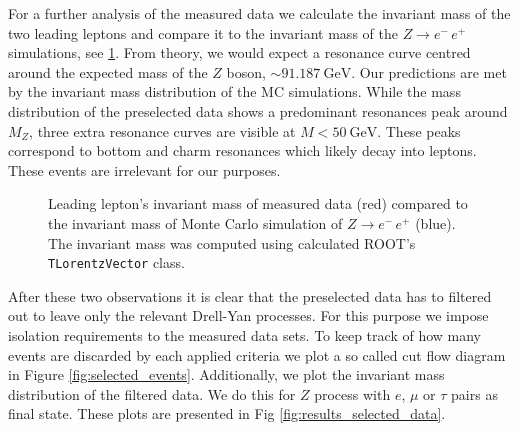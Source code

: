 \documentclass[11 pt]{article}
\begin{document}
For a further analysis of the measured data we calculate the invariant mass of the two leading leptons and compare it to the invariant mass of the $Z\to e^-\,e^+$ simulations, see \ref{fig:inv_mas}. From theory, we would expect a resonance curve centred around the expected mass of the $Z$ boson, $\sim \SI{91,187}{\giga\electronvolt}$. Our predictions are met by the invariant mass distribution of the MC simulations. While the mass distribution of the preselected data shows a predominant resonances peak around $M_Z$, three extra resonance curves are visible at $M< \SI{50}{\giga\electronvolt}$. These peaks correspond to bottom and charm resonances which likely decay into leptons. These events are irrelevant for our purposes. 
\begin{figure}[htbp]
    \centering
    \begin{subfigure}{0.5\textwidth}
        \centering
    \end{subfigure}
        \caption{\small Leading lepton's invariant mass of measured data (red) compared to the invariant mass of Monte Carlo simulation of $Z\to e^-\,e^+$ (blue). The invariant mass was computed using calculated ROOT's \texttt{TLorentzVector} class.}
        \label{fig:inv_mas}
\end{figure}

After these two observations it is clear that the preselected data has to filtered out to leave only the relevant Drell-Yan processes. For this purpose we impose isolation requirements to the measured data sets. To keep track of how many events are discarded by each applied criteria we plot a so called cut flow diagram in Figure \ref{fig:selected_events}. Additionally, we plot the invariant mass distribution of the filtered data. We do this for $Z$ process with $e$, $\mu$ or $\tau$ pairs as final state. These plots are presented in Fig \ref{fig:results_selected_data}. 
\end{document}
